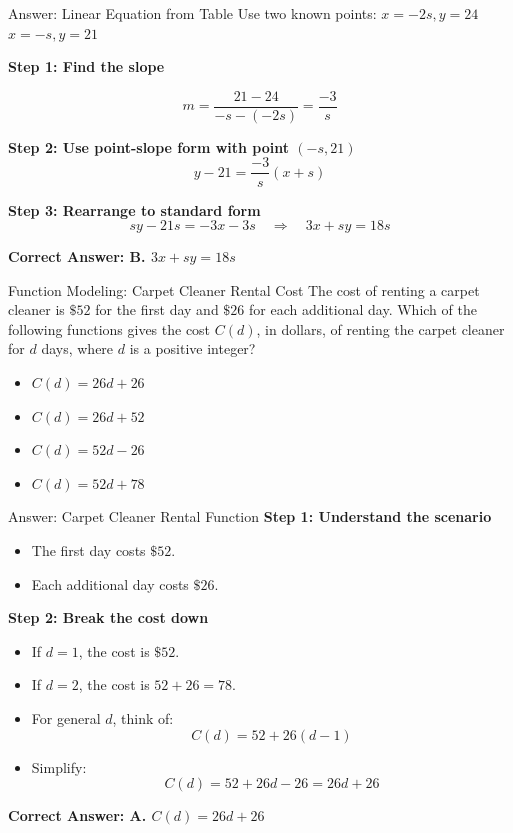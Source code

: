 \documentclass{beamer}
\begin{document}
\begin{frame}{Answer: Linear Equation from Table}
    Use two known points:  
    \(x = -2s, y = 24\)  
    \(x = -s, y = 21\)

    \textbf{Step 1: Find the slope}

    \[
    m = \frac{21 - 24}{-s - (-2s)} = \frac{-3}{s}
    \]

    \textbf{Step 2: Use point-slope form with point \((-s, 21)\)}  
    \[
    y - 21 = \frac{-3}{s}(x + s)
    \]

    \textbf{Step 3: Rearrange to standard form}
    \[
    sy - 21s = -3x - 3s \quad \Rightarrow \quad 3x + sy = 18s
    \]

    \vspace{1em}
    \textbf{Correct Answer: \textcolor{novelPurple}{B. \(3x + sy = 18s\)}}
\end{frame}


\begin{frame}{Function Modeling: Carpet Cleaner Rental Cost}
    The cost of renting a carpet cleaner is \(\$52\) for the first day and \(\$26\) for each additional day.  
    Which of the following functions gives the cost \(C(d)\), in dollars, of renting the carpet cleaner for \(d\) days,  
    where \(d\) is a positive integer?

    \vspace{1em}
    \begin{itemize}
        \item[\textbf{A.}] \(C(d) = 26d + 26\)
        \item[\textbf{B.}] \(C(d) = 26d + 52\)
        \item[\textbf{C.}] \(C(d) = 52d - 26\)
        \item[\textbf{D.}] \(C(d) = 52d + 78\)
    \end{itemize}
\end{frame}


\begin{frame}{Answer: Carpet Cleaner Rental Function}
    \textbf{Step 1: Understand the scenario}

    \begin{itemize}
        \item The first day costs \(\$52\).
        \item Each additional day costs \(\$26\).
    \end{itemize}

    \textbf{Step 2: Break the cost down}

    \begin{itemize}
        \item If \(d = 1\), the cost is \(\$52\).
        \item If \(d = 2\), the cost is \(52 + 26 = 78\).
        \item For general \(d\), think of:
        \[
        C(d) = 52 + 26(d - 1)
        \]
        \item Simplify:
        \[
        C(d) = 52 + 26d - 26 = 26d + 26
        \]
    \end{itemize}

    \textbf{Correct Answer: \textcolor{novelPurple}{A. \(C(d) = 26d + 26\)}}
\end{frame}
\end{document}
